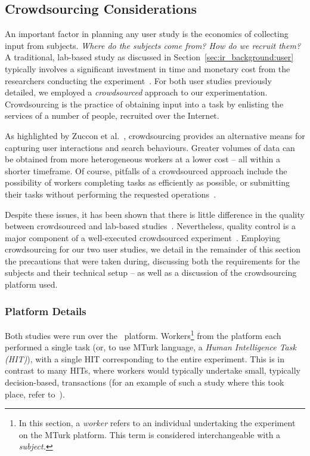 \subsection{Crowdsourcing Considerations}\label{sec:csm:methodology:user:crowdsourcing}
An important factor in planning any user study is the economics of collecting input from subjects. \emph{Where do the subjects come from? How do we recruit them?} A traditional, lab-based study as discussed in Section~\ref{sec:ir_background:user} typically involves a significant investment in time and monetary cost from the researchers conducting the experiment~\citep{spool2001testing}. For both user studies previously detailed, we employed a \emph{crowdsourced} approach to our experimentation. Crowdsourcing is the practice of obtaining input into a task by enlisting the services of a number of people, recruited over the Internet.

As highlighted by Zuccon et al.~\cite{zuccon2013crowdsourcing_comparisons}, crowdsourcing provides an alternative means for capturing user interactions and search behaviours. Greater volumes of data can be obtained from more heterogeneous workers at a lower cost -- all within a shorter timeframe. Of course, pitfalls of a crowdsourced approach include the possibility of workers completing tasks as efficiently as possible, or submitting their tasks without performing the requested operations~\citep{feild2010turkers}.

Despite these issues, it has been shown that there is little difference in the quality between crowdsourced and lab-based studies~\cite{zuccon2013crowdsourcing_comparisons}. Nevertheless, quality control is a major component of a well-executed crowdsourced experiment~\cite{bota2016information_cards}. Employing crowdsourcing for our two user studies, we detail in the remainder of this section the precautions that were taken during, discussing both the requirements for the subjects and their technical setup -- as well as a discussion of the crowdsourcing platform used.

\subsubsection{Platform Details}
Both studies were run over the~ platform. Workers\footnote{In this section, a \emph{worker} refers to an individual undertaking the experiment on the MTurk platform. This term is considered interchangeable with a \emph{subject.}} from the platform each performed a single task (or, to use MTurk language, a \emph{Human Intelligence Task (HIT)}), with a single HIT corresponding to the entire experiment. This is in contrast to many HITs, where workers would typically undertake small, typically decision-based, transactions (for an example of such a study where this took place, refer to~\cite{bota2016information_cards}).

